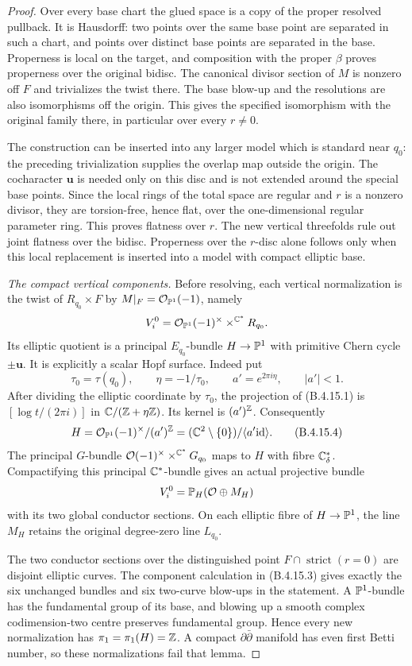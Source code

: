 \begin{proof}
Over every base chart the glued space is a copy of the
proper resolved pullback. It is Hausdorff: two points
over the same base point are separated in such a chart,
and points over distinct base points are separated in
the base. Properness is local on the target, and
composition with the proper $\beta$ proves properness
over the original bidisc. The canonical divisor section
of $M$ is nonzero off $F$ and trivializes the twist there.
The base blow-up and the resolutions are also
isomorphisms off the origin. This gives the specified
isomorphism with the original family there, in particular
over every $r\ne0$.

The construction can be inserted into any larger model
which is standard near $q_0$: the preceding
trivialization supplies the overlap map outside the
origin. The cocharacter $\mathbf u$ is needed only on
this disc and is not extended around the special base
points. Since the local rings of the total space are
regular and $r$ is a nonzero divisor, they are
torsion-free, hence flat, over the one-dimensional
regular parameter ring. This proves flatness over $r$.
The new vertical threefolds rule out joint flatness over
the bidisc. Properness over the $r$-disc alone follows
only when this local replacement is inserted into a
model with compact elliptic base.

\emph{The compact vertical components.}
Before resolving, each vertical normalization is the
twist of $R_{q_0}\times F$ by
$M|_F=\mathcal O_{\mathbb P^1}(-1)$, namely
\[
 V_i^0=\mathcal O_{\mathbb P^1}(-1)^\times
                    \mathbin{\times^{\mathbb C^*}}R_{q_0}.
\]
Its elliptic quotient is a principal $E_{q_0}$-bundle
$H\to\mathbb P^1$ with primitive Chern cycle
$\pm\mathbf u$. It is explicitly a scalar Hopf surface.
Indeed put
\[
 \tau_0=\tau(q_0),\qquad
 \eta=-1/\tau_0,\qquad a'=e^{2\pi i\eta},
 \qquad |a'|<1.
\]
After dividing the elliptic coordinate by $\tau_0$,
the projection of (B.4.15.1) is
$[\log t/(2\pi i)]$ in $\mathbb C/(\mathbb Z+\eta\mathbb Z)$.
Its kernel is $(a')^\mathbb Z$. Consequently
\[
 H=\mathcal O_{\mathbb P^1}(-1)^\times/(a')^\mathbb Z
   =(\mathbb C^2\setminus\{0\})/\langle a'\mathrm{id}\rangle.
 \tag{B.4.15.4}
\]
The principal $G$-bundle
$\mathcal O(-1)^\times\mathbin{\times^{\mathbb C^*}}G_{q_0}$
maps to $H$ with fibre $\mathbb C^*_{\delta}$.
Compactifying this principal $\mathbb C^*$-bundle gives an
actual projective bundle
\[
 V_i^0=\mathbb P_H(\mathcal O\oplus M_H)
\]
with its two global conductor sections. On each
elliptic fibre of $H\to\mathbb P^1$, the line $M_H$ retains
the original degree-zero line $L_{q_0}$.

The two conductor sections over the distinguished point
$F\cap\operatorname{strict}(r=0)$ are disjoint elliptic
curves. The component calculation in (B.4.15.3) gives
exactly the six unchanged bundles and six two-curve
blow-ups in the statement. A $\mathbb P^1$-bundle has the
fundamental group of its base, and blowing up a smooth
complex codimension-two centre preserves fundamental
group. Hence every new normalization has
$\pi_1=\pi_1(H)=\mathbb Z$. A compact
$\partial\bar\partial$ manifold has even first Betti
number, so these normalizations fail that lemma.


\end{proof}
